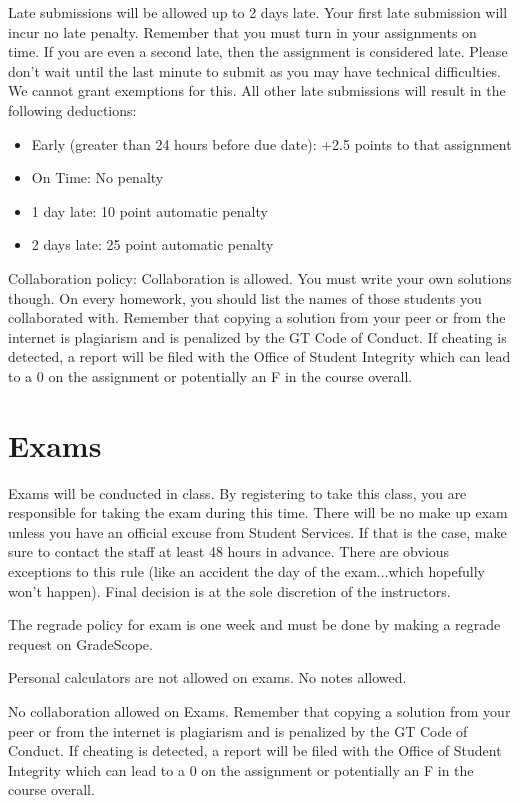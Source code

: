 \documentclass{article}
\begin{document}
Late submissions will be allowed up to 2 days late.  Your first late submission will incur no late penalty.  Remember that you must turn in your assignments on time.  If you are even a second late, then the assignment is considered late.  Please don't wait until the last minute to submit as you may have technical difficulties.  We cannot grant exemptions for this.  All other late submissions will result in the following deductions:

\begin{itemize}

    \item Early (greater than 24 hours before due date): +2.5 points to that assignment
    \item On Time: No penalty
    \item 1 day late: 10 point automatic penalty
    \item 2 days late: 25 point automatic penalty
\end{itemize}

Collaboration policy: Collaboration is allowed. You must write your own solutions though. On every homework, you should list the names of those students you collaborated with. Remember that copying a solution from your peer or from the internet is plagiarism and is penalized by the GT Code of Conduct. If cheating is detected, a report will be filed with the Office of Student Integrity which can lead to a 0 on the assignment or potentially an F in the course overall.

\section{Exams}
Exams will be conducted in class. By registering to take this class, you are responsible for taking the exam during this time. There will be no make up exam unless you have an official excuse from Student Services. If that is the case, make sure to contact the staff at least 48 hours in advance. There are obvious exceptions to this rule (like an accident the day of the exam...which hopefully won’t happen). Final decision is at the sole discretion of the instructors.

The regrade policy for exam is one week and must be done by making a regrade request on GradeScope.

Personal calculators are not allowed on exams. No notes allowed.

No collaboration allowed on Exams. Remember that copying a solution from your peer or from the internet is plagiarism and is penalized by the GT Code of Conduct. If cheating is detected, a report will be filed with the Office of Student Integrity which can lead to a 0 on the assignment or potentially an F in the course overall.
\end{document}
